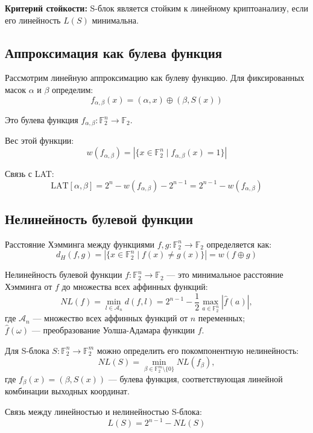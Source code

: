 \textbf{Критерий стойкости:} S-блок является стойким к линейному криптоанализу, если его линейность $L(S)$ минимальна.

\subsection{Аппроксимация как булева функция}

Рассмотрим линейную аппроксимацию как булеву функцию. Для фиксированных масок $\alpha$ и $\beta$ определим:
\[
    f_{\alpha,\beta}(x) =  (\alpha, x)  \oplus (\beta, S(x)) 
\]

Это булева функция $f_{\alpha,\beta} : \mathbb{F}_2^n \to \mathbb{F}_2$. 

Вес этой функции:
\[
    w(f_{\alpha,\beta}) = |\{x \in \mathbb{F}_2^n \mid f_{\alpha,\beta}(x) = 1\}|
\]

Связь с LAT:
\[
    \text{LAT}[\alpha, \beta] = 2^n - w(f_{\alpha, \beta}) - 2^{n-1} =2^{n-1} - w(f_{\alpha,\beta})
\]

\subsection{Нелинейность булевой функции}

\begin{definition}
Расстояние Хэмминга между функциями $f, g : \mathbb{F}_2^n \to \mathbb{F}_2$ определяется как:
\[
    d_H(f, g) = |\{x \in \mathbb{F}_2^n \mid f(x) \neq g(x)\}| = w(f \oplus g)
\]
\end{definition}

\begin{definition}
Нелинейность булевой функции $f : \mathbb{F}_2^n \to \mathbb{F}_2$ — это минимальное расстояние Хэмминга от $f$ до множества всех аффинных функций:
\[
    NL(f) = \min_{l \in \mathcal{A}_n} d(f, l) = 2^{n-1} - \frac{1}{2}\max_{a \in \mathbb{F}_2^n}|\widehat{f}(a)|,
\]
где $\mathcal{A}_n$ — множество всех аффинных функций от $n$ переменных; \\
\indent $\widehat{f}(\omega)$ — преобразование Уолша-Адамара функции $f$.
\end{definition}

Для S-блока $S : \mathbb{F}_2^n \to \mathbb{F}_2^m$ можно определить его покомпонентную нелинейность:
\[
    NL(S) = \min_{\beta \in \mathbb{F}_2^m \setminus \{0\}} NL(f_\beta),
\]
где $f_\beta(x) = (\beta, S(x))$ — булева функция, соответствующая линейной комбинации выходных координат.

\begin{theorem}
Связь между линейностью и нелинейностью S-блока:
\[
    L(S) = 2^{n-1} - NL(S)
\]
\end{theorem}

